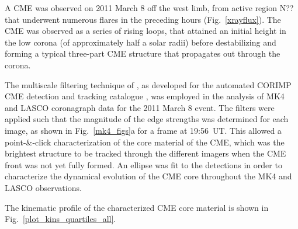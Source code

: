\documentclass[preprint2]{aastex}
\begin{document}

A CME was observed on 2011 March 8 off the west limb, from active region N?? that underwent numerous flares in the preceding hours (Fig.~\ref{xrayflux}). The CME was observed as a series of rising loops, that attained an initial height in the low corona (of approximately half a solar radii) before destabilizing and forming a typical three-part CME structure that propagates out through the corona.

The multiscale filtering technique of \citet{2008SoPh..248..457Y}, as developed for the automated CORIMP CME detection and tracking catalogue \citep{2012ApJ...752..145B}, was employed in the analysis of MK4 and LASCO coronagraph data for the 2011 March 8 event. The filters were applied such that the magnitude of the edge strengths was determined for each image, as shown in Fig.~\ref{mk4_figs}a for a frame at 19:56~UT. This allowed a point-\&-click characterization of the core material of the CME, which was the brightest structure to be tracked through the different imagers when the CME front was not yet fully formed. An ellipse was fit to the detections in order to characterize the dynamical evolution of the CME core throughout the MK4 and LASCO observations.

The kinematic profile of the characterized CME core material is shown in Fig.~\ref{plot_kins_quartiles_all}.
\end{document}
